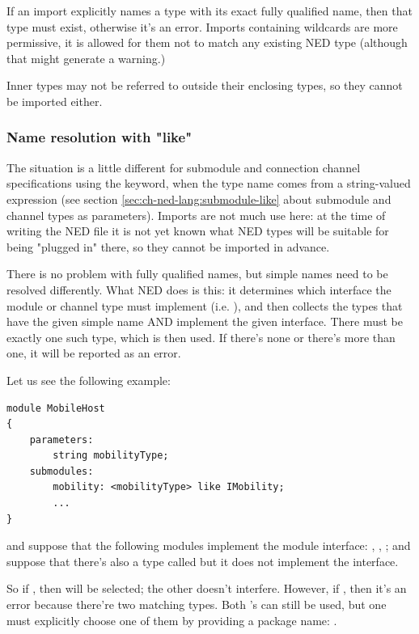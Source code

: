 If an import explicitly names a type with its exact fully qualified name,
then that type must exist, otherwise it's an error. Imports containing
wildcards are more permissive, it is allowed for them not to match any
existing NED type (although that might generate a warning.)

Inner types may not be referred to outside their enclosing types, so they
cannot be imported either.


\subsubsection{Name resolution with "like"}

The situation is a little different for submodule and connection channel
specifications using the  keyword, when the type name comes
from a string-valued expression (see section
\ref{sec:ch-ned-lang:submodule-like} about submodule and channel types as
parameters). Imports are not much use here: at the time of writing the NED
file it is not yet known what NED types will be suitable for being "plugged
in" there, so they cannot be imported in advance.

There is no problem with fully qualified names, but simple names need
to be resolved differently. What NED does is this: it determines which
interface the module or channel type must implement (i.e. ),
and then collects the types that have the given simple name AND implement
the given interface. There must be exactly one such type, which is then used.
If there's none or there's more than one, it will be reported as an error.

Let us see the following example:

\begin{Verbatim}
module MobileHost
{
    parameters:
        string mobilityType;
    submodules:
        mobility: <mobilityType> like IMobility;
        ...
}
\end{Verbatim}

and suppose that the following modules implement the  module
interface: , ,
; and suppose that there's also a type
called  but it does not implement the
interface.

So if , then
 will be selected; the other
 doesn't interfere. However, if
, then it's an error because there're two
matching  types. Both 's can still be used,
but one must explicitly choose one of them by providing a package name:
.


